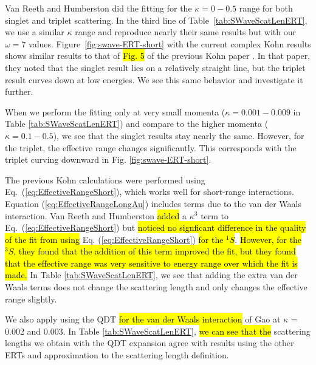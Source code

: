 \documentclass[preprint,showpacs,showkeys,preprintnumbers,amsmath,amssymb,longbibliography,pra,aps]{revtex4-1}
\begin{document}
{Van Reeth and Humberston \cite{VanReeth2003} did the fitting for the
$\kappa = 0-0.5$ range for both singlet and triplet scattering. In the third line of
Table~\ref{tab:SWaveScatLenERT}, we use a similar $\kappa$ range and reproduce
nearly their same results but with our $\omega = 7$ values.
Figure~\ref{fig:swave-ERT-short} with the current complex Kohn results shows
similar results to that of \hl{Fig. 5} of the previous Kohn paper
\cite{VanReeth2003}. In that paper, they noted that the singlet result lies on a
relatively straight line, but the triplet result curves down at low energies. We see
this same behavior and investigate it further.

When we perform the fitting only at very small momenta
($\kappa = 0.001 - 0.009$ in
Table \ref{tab:SWaveScatLenERT}) and compare to the higher momenta
($\kappa = 0.1 - 0.5$), we see that the singlet results stay nearly the same. 
However, for the triplet, the effective range changes significantly. This 
corresponds with the triplet curving downward in
Fig. \ref{fig:swave-ERT-short}.

The previous Kohn calculations \cite{VanReeth2003} were performed using
Eq.~(\ref{eq:EffectiveRangeShort}), which works well for short-range
interactions. Equation (\ref{eq:EffectiveRangeLongAu}) includes terms due
to the van der Waals interaction. Van Reeth and Humberston \cite{VanReeth2003}
\hl{added} a $\kappa^3$ term to Eq.~(\ref{eq:EffectiveRangeShort}) but \hl{noticed
no signficant difference in the quality of the fit from using}
Eq. (\ref{eq:EffectiveRangeShort}) \hl{for the $^1S$}.
\hl{However, for the $^3S$, they found that the addition of this term improved the fit,
but they found that the effective range was very sensitive to energy
range over which the fit is made.}
In Table \ref{tab:SWaveScatLenERT}, we see that adding the extra van der
Waals terms does not change the scattering length and only changes the
effective range slightly.

We also apply using the QDT \hl{for the 
van der Waals interaction}
of Gao \cite{Gao1998} at $\kappa$ = 0.002 and 0.003.
In Table \ref{tab:SWaveScatLenERT}, \hl{we can see that the} scattering lengths 
we obtain with the QDT expansion agree with results using the other 
ERTs and approximation to the scattering length definition.


}
\end{document}
